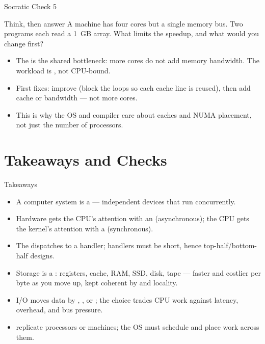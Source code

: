 \documentclass[aspectratio=169]{beamer}
\begin{document}
\begin{frame}{Socratic Check 5}
  \begin{block}{Think, then answer}
    A machine has four cores but a single memory bus. Two programs each read a
    1~GB array. What limits the speedup, and what would you change first?
  \end{block}
  \vspace{0.2cm}
  \begin{itemize}
    \item The  is the shared bottleneck: more cores do not add
      memory bandwidth. The workload is , not CPU-bound.
    \item First fixes: improve  (block the loops so each cache
      line is reused), then add cache or bandwidth --- not more cores.
    \item This is why the OS and compiler care about caches and NUMA placement,
      not just the number of processors.
  \end{itemize}
\end{frame}

\section{Takeaways and Checks}

\begin{frame}{Takeaways}
  \begin{itemize}
    \item A computer system is a  ---
      independent devices that run concurrently.
    \item Hardware gets the CPU's attention with an 
      (asynchronous); the CPU gets the kernel's attention with a 
      (synchronous).
    \item The  dispatches to a handler; handlers must be
      short, hence top-half/bottom-half designs.
    \item Storage is a : registers, cache, RAM, SSD, disk, tape
      --- faster and costlier per byte as you move up, kept coherent by
       and locality.
    \item I/O moves data by , , or ; the
      choice trades CPU work against latency, overhead, and bus pressure.
    \item {} replicate processors or machines;
      the OS must schedule and place work across them.
  \end{itemize}
\end{frame}
\end{document}
